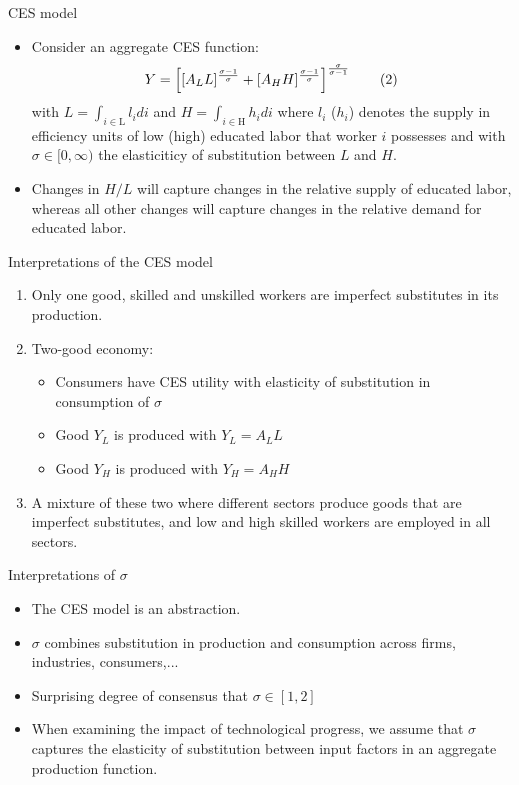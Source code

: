 \documentclass[notes=show]{beamer}
\begin{document}
\begin{frame}{CES model}
\begin{itemize}
\item Consider an aggregate CES function:
\[
Y=\left[ [A_{L}L]^{\frac{\sigma -1}{\sigma }}+[A_{H}H]^{%
\frac{\sigma -1}{\sigma }}\right] ^{\frac{\sigma }{\sigma -1}} \tag{2} \label{eq2}
\]%
with $L=\int_{i\in \mathrm{L}}l_{i}di$ and $H=\int_{i\in \mathrm{H}}h_{i}di$
where $l_{i}$ ($h_{i}$) denotes the supply in efficiency units of low (high)
educated labor that worker $i$ possesses and with $\sigma \in [0, \infty) $ the elasticiticy of substitution between $L$ and $H$.\bigskip
\item Changes in $H/L$ will capture changes in the relative supply of educated labor, whereas all other changes will capture changes in the relative demand for educated labor.
\end{itemize}
\end{frame}

\begin{frame}{Interpretations of the CES model}
\begin{enumerate}
\item Only one good, skilled and unskilled workers are imperfect substitutes in its production. \medskip
\item Two-good economy: \medskip
\begin{itemize}
\item Consumers have CES utility with elasticity of substitution in consumption of $ \sigma $ \medskip
\item Good $ Y_{L} $ is produced with $ Y_{L} = A_{L}L $ \medskip
\item Good $ Y_{H} $ is produced with $ Y_{H} = A_{H}H $ \medskip
\end{itemize}
\item A mixture of these two where different sectors produce goods that are imperfect substitutes, and low and high skilled workers are employed in all sectors.
\end{enumerate}
\end{frame}

\begin{frame}{Interpretations of $\sigma $}
\begin{itemize}
\item The CES model is an abstraction. \medskip
\item $ \sigma $ combines substitution in production and consumption across firms, industries, consumers,... \medskip
\item Surprising degree of consensus that $ \sigma \in [1,2]$ \medskip
\item When examining the impact of technological progress, we assume that $ \sigma $ captures the elasticity of substitution between input factors in an aggregate production function.
\end{itemize}
\end{frame}
\end{document}
